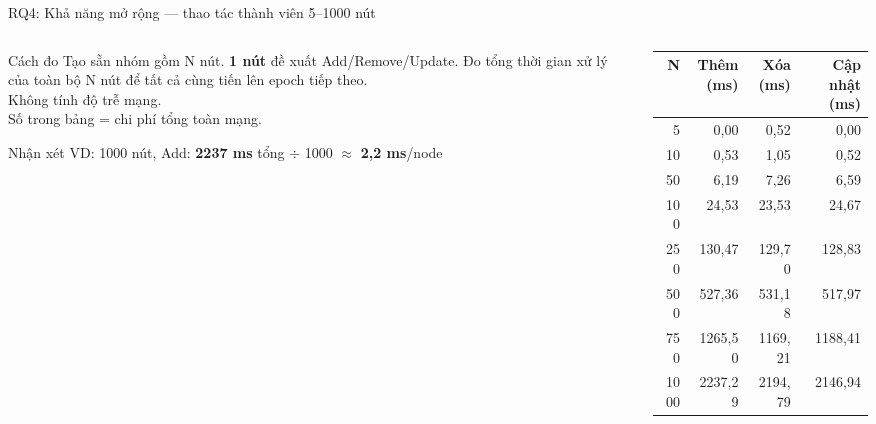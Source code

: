 \documentclass[t, aspectratio=169]{beamer}
\begin{document}
\begin{frame}[fragile,c]{RQ4: Khả năng mở rộng --- thao tác thành viên 5--1000 nút}
	\vspace{0.3em}
	\begin{columns}[c]
		\begin{column}{0.42\textwidth}
			\begin{block}{Cách đo}
				\scriptsize
				Tạo sẵn nhóm gồm N nút. \textbf{1 nút} đề xuất Add/Remove/Update. Đo \alert{tổng thời gian xử lý của toàn bộ N nút} để tất cả cùng tiến lên epoch tiếp theo.\\[0.3em]
				\alert{Không tính độ trễ mạng.}\\[0.3em]
				Số trong bảng = chi phí tổng toàn mạng.
			\end{block}
			\vspace{0.5em}
			\begin{block}{Nhận xét}
				\scriptsize
				VD: 1000 nút, Add: \textbf{2237 ms} tổng $\div$ 1000 $\approx$ \textbf{2,2 ms}/node\\[0.2em]
			\end{block}
		\end{column}
		\begin{column}{0.55\textwidth}
			\centering
			\scriptsize
			\renewcommand{\arraystretch}{1.1}
			\setlength{\tabcolsep}{8pt}
			\begin{tabular}{|r|r|r|r|}
				\hline
				\textbf{N} & \textbf{Thêm (ms)} & \textbf{Xóa (ms)} & \textbf{Cập nhật (ms)} \\
				\hline
				5 & 0,00 & 0,52 & 0,00 \\
				\hline
				10 & 0,53 & 1,05 & 0,52 \\
				\hline
				50 & 6,19 & 7,26 & 6,59 \\
				\hline
				100 & 24,53 & 23,53 & 24,67 \\
				\hline
				250 & 130,47 & 129,70 & 128,83 \\
				\hline
				500 & 527,36 & 531,18 & 517,97 \\
				\hline
				750 & 1265,50 & 1169,21 & 1188,41 \\
				\hline
				1000 & 2237,29 & 2194,79 & 2146,94 \\
				\hline
			\end{tabular}
		\end{column}
	\end{columns}
\end{frame}
\end{document}
